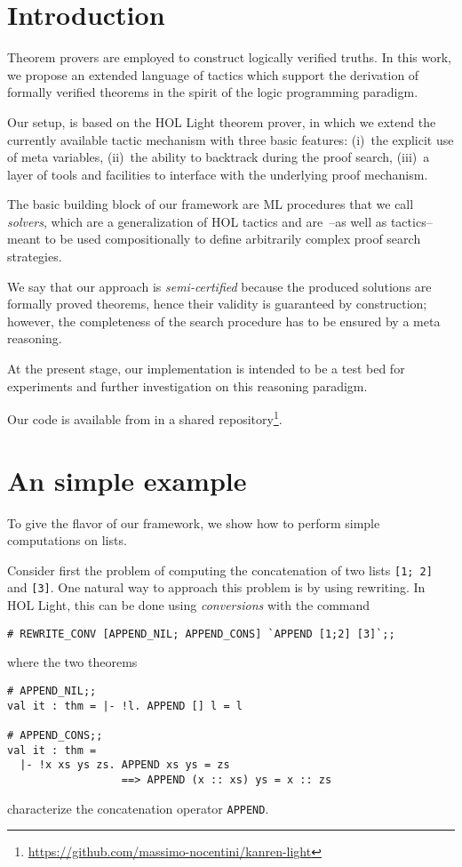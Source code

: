 
\section{Introduction}
\label{sec:introduction}

Theorem provers are employed to construct logically verified truths.
In this work, we propose an extended language of tactics which support
the derivation of formally verified theorems in the spirit of the
logic programming paradigm.

Our setup, is based on the HOL Light theorem prover, in which we
extend the currently available tactic mechanism with three basic
features: (i)~the explicit use of meta variables, (ii)~the ability to
backtrack during the proof search, (iii)~a layer of tools and
facilities to interface with the underlying proof mechanism.

The basic building block of our framework are ML procedures that we
call \emph{solvers}, which are a generalization of HOL tactics and
are~--as well as tactics-- meant to be used compositionally to define
arbitrarily complex proof search strategies.

We say that our approach is \emph{semi-certified} because the produced
solutions are formally proved theorems, hence their validity is
guaranteed by construction; however, the completeness of the search
procedure has to be ensured by a meta reasoning.

At the present stage, our implementation is intended to be a test bed
for experiments and further investigation on this reasoning paradigm.

Our code is available from in a shared
repository\footnote{\url{https://github.com/massimo-nocentini/kanren-light}}.

\section{An simple example}
\label{sec:an-simple-example}

To give the flavor of our framework, we show how to perform simple
computations on lists.

Consider first the problem of computing the concatenation of two lists
\verb|[1; 2]| and \verb|[3]|.  One natural way to approach this
problem is by using rewriting.  In HOL Light, this can be done using
\emph{conversions} with the command
\begin{verbatim}
# REWRITE_CONV [APPEND_NIL; APPEND_CONS] `APPEND [1;2] [3]`;;
\end{verbatim}
where the two theorems
\begin{verbatim}
# APPEND_NIL;;
val it : thm = |- !l. APPEND [] l = l

# APPEND_CONS;;
val it : thm =
  |- !x xs ys zs. APPEND xs ys = zs
                  ==> APPEND (x :: xs) ys = x :: zs
\end{verbatim}
characterize the concatenation operator \verb|APPEND|.

